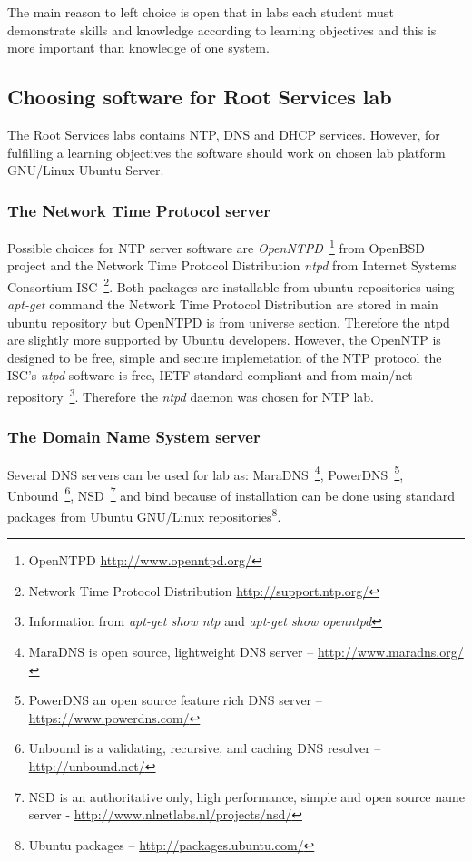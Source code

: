 The main reason to left choice is open that in labs each student must demonstrate skills and knowledge according to learning objectives and this is more important than knowledge of one system.

\subsection{Choosing software for Root Services lab}
The Root Services labs contains \gls{NTP}, \gls{DNS} and \gls{DHCP} services. However, for fulfilling a learning objectives the software should work on chosen lab platform GNU/Linux Ubuntu Server. 
\subsubsection{The Network Time Protocol server}
Possible choices for \gls{NTP} server software are \emph{OpenNTPD}~\footnote{OpenNTPD \url{http://www.openntpd.org/}
} from OpenBSD  project and the Network Time Protocol Distribution \emph{ntpd} from  Internet Systems Consortium \gls{ISC}~\footnote{Network Time Protocol Distribution \url{http://support.ntp.org/}}. Both packages are installable from ubuntu repositories using \emph{apt-get} command the Network Time Protocol Distribution are stored in main ubuntu repository but OpenNTPD is from universe section. Therefore the \gls{ntpd} are slightly more supported by Ubuntu developers.
However, the OpenNTP is designed to be free, simple and secure implemetation of the \gls{NTP} protocol the \gls{ISC}'s \emph{ntpd} software is free, \gls{IETF} standard compliant and from main/net repository~\footnote{Information from \emph{apt-get show ntp} and \emph{apt-get show openntpd}}. Therefore the \emph{ntpd} daemon was chosen for \gls{NTP} lab.
\subsubsection{The Domain Name System server}
Several \gls{DNS} servers can be used for lab as: MaraDNS~\footnote{ MaraDNS is open source, lightweight \gls{DNS} server -- \url{http://www.maradns.org/}}, PowerDNS~\footnote{PowerDNS an open source feature rich \gls{DNS} server -- \url{https://www.powerdns.com/}}, Unbound~\footnote{Unbound is a validating, recursive, and caching \gls{DNS} resolver -- \url{http://unbound.net/}}, NSD~\footnote{NSD is an authoritative only, high performance, simple and open source name server - \url{http://www.nlnetlabs.nl/projects/nsd/}} and bind because of installation can be done using standard packages from Ubuntu GNU/Linux repositories\footnote{Ubuntu packages --  \url{http://packages.ubuntu.com/}}.

